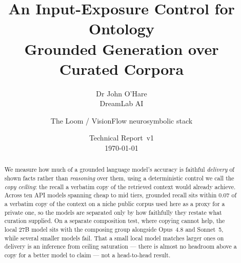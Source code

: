 \documentclass[10pt,twocolumn]{article}
\title{\vspace{-1.2cm}\bfseries An Input-Exposure Control for Ontology\\
Grounded Generation over Curated Corpora}
\author{Dr John O'Hare\\ \small DreamLab AI \and \small The Loom / VisionFlow neurosymbolic stack}
\date{Technical Report~v1 \\ \today}
\begin{document}
\maketitle

\begin{abstract}
\noindent
We measure how much of a grounded language model's accuracy is faithful \emph{delivery} of shown facts rather than \emph{reasoning} over them, using a deterministic control we call the \emph{copy ceiling}: the recall a verbatim copy of the retrieved context would already achieve. Across ten API models spanning cheap to mid tiers, grounded recall sits within 0.07 of a verbatim copy of the context on a niche public corpus used here as a proxy for a private one, so the models are separated only by how faithfully they restate what curation supplied. On a separate composition test, where copying cannot help, the local 27B model sits with the composing group alongside Opus~4.8 and Sonnet~5, while several smaller models fail. That a small local model matches larger ones on delivery is an inference from ceiling saturation --- there is almost no headroom above a copy for a better model to claim --- not a head-to-head result.


\end{abstract}
\end{document}
